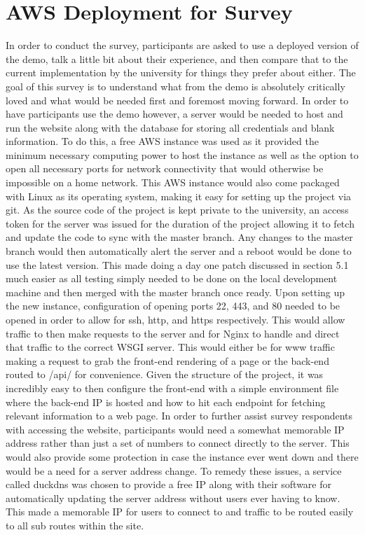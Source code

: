 \section{AWS Deployment for Survey}

In order to conduct the survey, participants are asked to use a deployed version of the demo, talk a little bit about their experience, and then compare that to the current implementation by the university for things they prefer about either. The goal of this survey is to understand what from the demo is absolutely critically loved and what would be needed first and foremost moving forward. In order to have participants use the demo however, a server would be needed to host and run the website along with the database for storing all credentials and blank information. To do this, a free AWS instance was used as it provided the minimum necessary computing power to host the instance as well as the option to open all necessary ports for network connectivity that would otherwise be impossible on a home network.
\newline
\newline
This AWS instance would also come packaged with Linux as its operating system, making it easy for setting up the project via git. As the source code of the project is kept private to the university, an access token for the server was issued for the duration of the project allowing it to fetch and update the code to sync with the master branch. Any changes to the master branch would then automatically alert the server and a reboot would be done to use the latest version. This made doing a day one patch discussed in section 5.1 much easier as all testing simply needed to be done on the local development machine and then merged with the master branch once ready.
\newline
\newline
Upon setting up the new instance, configuration of opening ports 22, 443, and 80 needed to be opened in order to allow for ssh, http, and https respectively. This would allow traffic to then make requests to the server and for Nginx to handle and direct that traffic to the correct WSGI server. This would either be for www traffic making a request to grab the front-end rendering of a page or the back-end routed to /api/ for convenience. Given the structure of the project, it was incredibly easy to then configure the front-end with a simple environment file where the back-end IP is hosted and how to hit each endpoint for fetching relevant information to a web page.
\newline
\newline
In order to further assist survey respondents with accessing the website, participants would need a somewhat memorable IP address rather than just a set of numbers to connect directly to the server. This would also provide some protection in case the instance ever went down and there would be a need for a server address change. To remedy these issues, a service called duckdns was chosen to provide a free IP along with their software for automatically updating the server address without users ever having to know. This made a memorable IP for users to connect to and traffic to be routed easily to all sub routes within the site.